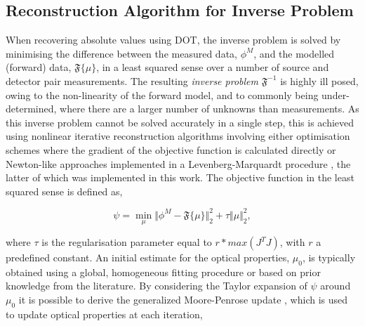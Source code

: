 \documentclass[twoside]{bhamthesis}
\theoremstyle{definition}
\begin{document}


\subsection{Reconstruction Algorithm for Inverse Problem}
\label{section:Reconstruction}

When recovering absolute values using DOT, the inverse problem is solved by minimising the difference between the measured data, $\phi^M$, and the modelled (forward) data, $\mathfrak{F} \lbrace \mu \rbrace $, in a least squared sense over a number of source and detector pair measurements. The resulting \textit{inverse problem} $\mathfrak{F}^{-1}$ is highly ill posed, owing to the non-linearity of the forward model, and to commonly being under-determined, where there are a larger number of unknowns than measurements. As this inverse problem cannot be solved accurately in a single step, this is achieved using nonlinear iterative reconstruction algorithms involving either optimisation schemes where the gradient of the objective function is calculated directly \cite{arridge1998gradient,hielscher1999gradient} or Newton-like approaches implemented in a Levenberg-Marquardt procedure \cite{jiang1996optical,dehghani2009near}, the latter of which was implemented in this work. The objective function in the least squared sense is defined as,

\begin{equation} 
 \psi = \min_{\mu} \Vert \phi^M - \mathfrak{F} \lbrace \mu \rbrace \Vert^2_2 + \tau \Vert \mu \Vert^2_2, 
  \label{eqn:ObjFun}
\end{equation}

where $\tau$ is the regularisation parameter equal to $r * max(J^T J)$, with $r$ a predefined constant. An initial estimate for the optical properties, $\mu_0$, is typically obtained using a global, homogeneous fitting procedure \cite{dehghani2003multiwavelength} or based on prior knowledge from the literature. By considering the Taylor expansion of $\psi$ around $\mu_0$ it is possible to derive the generalized Moore-Penrose update \cite{penrose1955generalized}, which is used to update optical properties at each iteration,  
\end{document}
